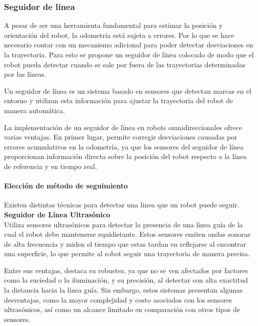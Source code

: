 \subsubsection{Seguidor de línea}

A pesar de ser una herramienta fundamental para estimar la posición y orientación del robot, la odometría está sujeta a errores. Por lo que se hace necesario contar con un mecanismo adicional para poder detectar desviaciones en la trayectoria. Para esto se propone un seguidor de línea colocado de modo que el robot pueda detectar cuando se sale por fuera de las trayectorias determinadas por las líneas.

Un seguidor de línea es un sistema basado en sensores que detectan marcas en el entorno y utilizan esta información para ajustar la trayectoria del robot de manera automática.

La implementación de un seguidor de línea en robots omnidireccionales ofrece varias ventajas. En primer lugar, permite corregir desviaciones causadas por errores acumulativos en la odometría, ya que los sensores del seguidor de línea proporcionan información directa sobre la posición del robot respecto a la línea de referencia y en tiempo real.


\paragraph{Elección de método de seguimiento} \mbox{} \vspace{8pt}

Existen distintas técnicas para detectar una linea que un robot puede seguir. \\

\textbf{Seguidor de Línea Ultrasónico} \mbox{} \vspace{6pt} \\
Utiliza sensores ultrasónicos para detectar la presencia de una línea guía de la cual el robot debe mantenerse equidistante. Estos sensores emiten ondas sonoras de alta frecuencia y miden el tiempo que estas tardan en reflejarse al encontrar una superficie, lo que permite al robot seguir una trayectoria de manera precisa.

Entre sus ventajas, destaca su robustez, ya que no se ven afectados por factores como la suciedad o la iluminación, y su precisión, al detectar con alta exactitud la distancia hacia la línea guía. Sin embargo, estos sistemas presentan algunas desventajas, como la mayor complejidad y costo asociados con los sensores ultrasónicos, así como un alcance limitado en comparación con otros tipos de sensores. \cite{venkateshrfidultrasonic} \cite{aungultrasonic} \\


